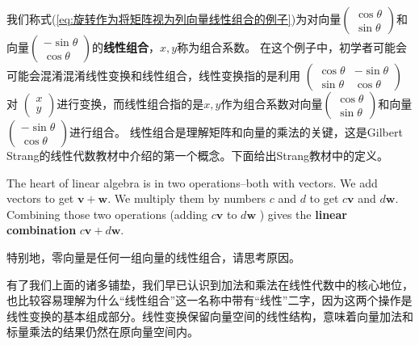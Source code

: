 我们称式(\ref{eq:旋转作为将矩阵视为列向量线性组合的例子})为对向量$\left(\begin{array}{c}
\cos \theta \\
\sin \theta
\end{array}\right)$和向量$\left(\begin{array}{c}
-\sin \theta \\
\cos \theta
\end{array}\right)$的\textcolor{third}{\bf 线性组合}，$x,y$称为组合系数。
在这个例子中，初学者可能会可能会混淆混淆线性变换和线性组合，线性变换指的是利用
$\left(\begin{array}{cc}
\cos \theta & -\sin \theta \\
\sin \theta & \cos \theta
\end{array}\right)$对
$\left(\begin{array}{c}
x \\
y
\end{array}\right)$进行变换，而线性组合指的是$x,y$作为组合系数对向量$\left(\begin{array}{c}
\cos \theta \\
\sin \theta
\end{array}\right)$和向量$\left(\begin{array}{c}
-\sin \theta \\
\cos \theta
\end{array}\right)$进行组合。
线性组合是理解矩阵和向量的乘法的关键，这是Gilbert Strang的线性代数教材中介绍的第一个概念。下面给出Strang教材中的定义。
\begin{definition}[线性组合]
    The heart of linear algebra is in two operations--both with vectors. We add vectors to get $\boldsymbol{v}+\boldsymbol{w}$. We multiply them by numbers $c$ and $d$ to get $c \boldsymbol{v}$ and $d \boldsymbol{w}$. Combining those two operations (adding $c \boldsymbol{v}$ to $d \boldsymbol{w}$ ) gives the \textcolor{third}{\bf linear combination} $c \boldsymbol{v}+d \boldsymbol{w}$.
\end{definition}

\vspace{0.3cm}

\begin{note}
    特别地，零向量是任何一组向量的线性组合，请思考原因。
\end{note}

\vspace{0.3cm}

有了我们上面的诸多铺垫，我们早已认识到加法和乘法在线性代数中的核心地位，也比较容易理解为什么“线性组合”这一名称中带有“线性”二字，因为这两个操作是线性变换的基本组成部分。线性变换保留向量空间的线性结构，意味着向量加法和标量乘法的结果仍然在原向量空间内。

